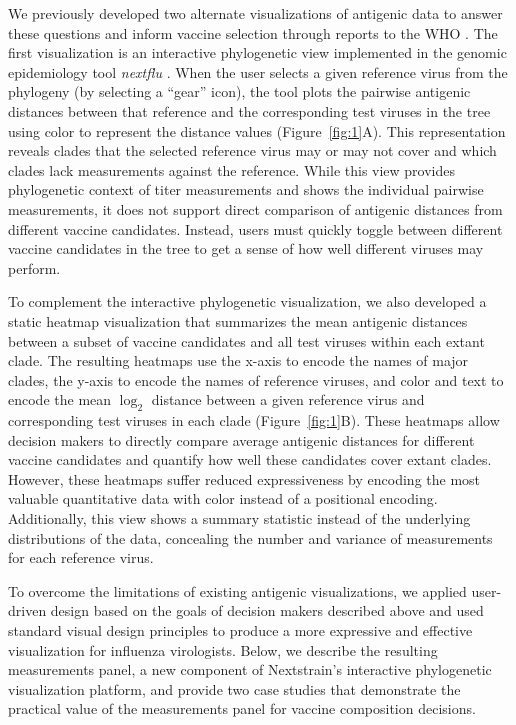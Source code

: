 \documentclass[utf8]{FrontiersinHarvard} %
\begin{document}
We previously developed two alternate visualizations of antigenic data to answer these questions and inform vaccine selection through reports to the WHO \citep{BedfordWHO2018,BedfordWHO2019}.
The first visualization is an interactive phylogenetic view implemented in the genomic epidemiology tool \emph{nextflu} \citep{NeherBedford2015,NeherBedford2018}.
When the user selects a given reference virus from the phylogeny (by selecting a ``gear'' icon), the tool plots the pairwise antigenic distances between that reference and the corresponding test viruses in the tree using color to represent the distance values (Figure~\ref{fig:1}A).
This representation reveals clades that the selected reference virus may or may not cover and which clades lack measurements against the reference.
While this view provides phylogenetic context of titer measurements and shows the individual pairwise measurements, it does not support direct comparison of antigenic distances from different vaccine candidates.
Instead, users must quickly toggle between different vaccine candidates in the tree to get a sense of how well different viruses may perform.

To complement the interactive phylogenetic visualization, we also developed a static heatmap visualization that summarizes the mean antigenic distances between a subset of vaccine candidates and all test viruses within each extant clade.
The resulting heatmaps use the x-axis to encode the names of major clades, the y-axis to encode the names of reference viruses, and color and text to encode the mean $\log_{2}$ distance between a given reference virus and corresponding test viruses in each clade (Figure~\ref{fig:1}B).
These heatmaps allow decision makers to directly compare average antigenic distances for different vaccine candidates and quantify how well these candidates cover extant clades.
However, these heatmaps suffer reduced expressiveness by encoding the most valuable quantitative data with color instead of a positional encoding.
Additionally, this view shows a summary statistic instead of the underlying distributions of the data, concealing the number and variance of measurements for each reference virus.

To overcome the limitations of existing antigenic visualizations, we applied user-driven design based on the goals of decision makers described above and used standard visual design principles to produce a more expressive and effective visualization for influenza virologists.
Below, we describe the resulting measurements panel, a new component of Nextstrain's interactive phylogenetic visualization platform, and provide two case studies that demonstrate the practical value of the measurements panel for vaccine composition decisions.
\end{document}
